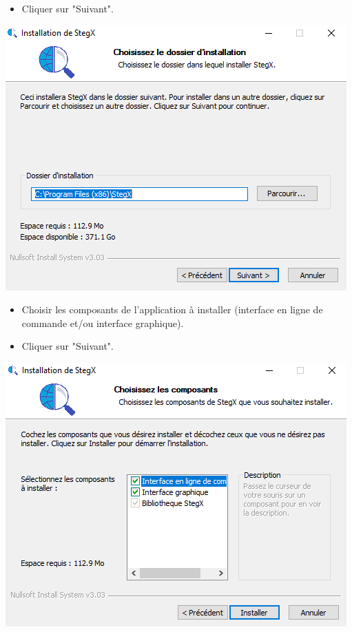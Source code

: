 \documentclass[11pt]{article}
\begin{document}
\begin{itemize}
\item Cliquer sur "Suivant". 
\end{itemize}

\hspace{1cm}
\includegraphics[scale=1]{pictures/taille.png}
\vspace{1cm}

\begin{itemize}
\item Choisir les composants de l'application à installer (interface 
en ligne de commande et/ou interface graphique). 
\item Cliquer sur "Suivant". 
\end{itemize}

\hspace{1cm}
\includegraphics[scale=1]{pictures/choix.png}
\vspace{1cm}
\end{document}
